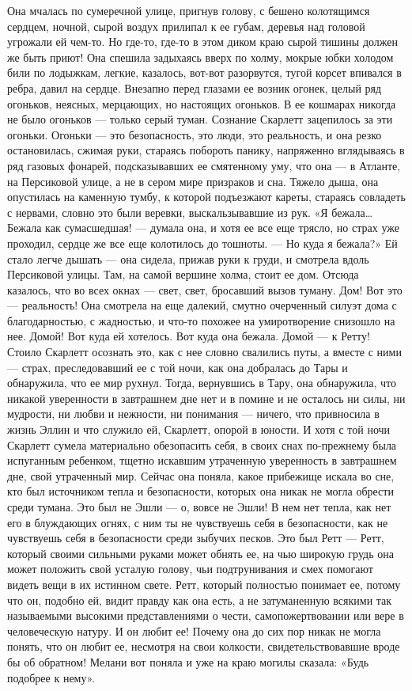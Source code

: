 Она мчалась по сумеречной улице, пригнув голову, с бешено колотящимся сердцем, ночной, сырой воздух прилипал к ее губам, деревья над головой угрожали ей чем-то. Но где-то, где-то в этом диком краю сырой тишины должен же быть приют! Она спешила задыхаясь вверх по холму, мокрые юбки холодом били по лодыжкам, легкие, казалось, вот-вот разорвутся, тугой корсет впивался в ребра, давил на сердце.
Внезапно перед глазами ее возник огонек, целый ряд огоньков, неясных, мерцающих, но настоящих огоньков. В ее кошмарах никогда не было огоньков — только серый туман. Сознание Скарлетт зацепилось за эти огоньки. Огоньки — это безопасность, это люди, это реальность, и она резко остановилась, сжимая руки, стараясь побороть панику, напряженно вглядываясь в ряд газовых фонарей, подсказывавших ее смятенному уму, что она — в Атланте, на Персиковой улице, а не в сером мире призраков и сна.
Тяжело дыша, она опустилась на каменную тумбу, к которой подъезжают кареты, стараясь совладеть с нервами, словно это были веревки, выскальзывавшие из рук.
«Я бежала… Бежала как сумасшедшая! — думала она, и хотя ее все еще трясло, но страх уже проходил, сердце же все еще колотилось до тошноты. — Но куда я бежала?» Ей стало легче дышать — она сидела, прижав руки к груди, и смотрела вдоль Персиковой улицы. Там, на самой вершине холма, стоит ее дом. Отсюда казалось, что во всех окнах — свет, свет, бросавший вызов туману. Дом! Вот это — реальность! Она смотрела на еще далекий, смутно очерченный силуэт дома с благодарностью, с жадностью, и что-то похожее на умиротворение снизошло на нее.
Домой! Вот куда ей хотелось. Вот куда она бежала. Домой — к Ретту!
Стоило Скарлетт осознать это, как с нее словно свалились путы, а вместе с ними — страх, преследовавший ее с той ночи, как она добралась до Тары и обнаружила, что ее мир рухнул. Тогда, вернувшись в Тару, она обнаружила, что никакой уверенности в завтрашнем дне нет и в помине и не осталось ни силы, ни мудрости, ни любви и нежности, ни понимания — ничего, что привносила в жизнь Эллин и что служило ей, Скарлетт, опорой в юности. И хотя с той ночи Скарлетт сумела материально обезопасить себя, в своих снах по-прежнему была испуганным ребенком, тщетно искавшим утраченную уверенность в завтрашнем дне, свой утраченный мир.
Сейчас она поняла, какое прибежище искала во сне, кто был источником тепла и безопасности, которых она никак не могла обрести среди тумана. Это был не Эшли — о, вовсе не Эшли! В нем нет тепла, как нет его в блуждающих огнях, с ним ты не чувствуешь себя в безопасности, как не чувствуешь себя в безопасности среди зыбучих песков. Это был Ретт — Ретт, который своими сильными руками может обнять ее, на чью широкую грудь она может положить свой усталую голову, чьи подтрунивания и смех помогают видеть вещи в их истинном свете. Ретт, который полностью понимает ее, потому что он, подобно ей, видит правду как она есть, а не затуманенную всякими так называемыми высокими представлениями о чести, самопожертвовании или вере в человеческую натуру. И он любит ее! Почему она до сих пор никак не могла понять, что он любит ее, несмотря на свои колкости, свидетельствовавшие вроде бы об обратном! Мелани вот поняла и уже на краю могилы сказала: «Будь подобрее к нему».
